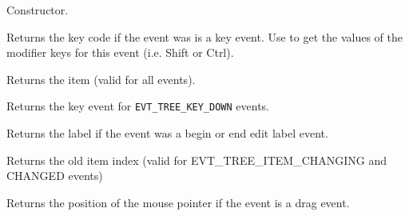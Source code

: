 Constructor.



Returns the key code if the event was is a key event. Use 
 to get the values of the
modifier keys for this event (i.e. Shift or Ctrl).



Returns the item (valid for all events).

\label{wxtreeeventgetkeyevent}


Returns the key event for {\tt EVT\_TREE\_KEY\_DOWN} events.



Returns the label if the event was a begin or end edit label event.



Returns the old item index (valid for EVT\_TREE\_ITEM\_CHANGING and CHANGED events)



Returns the position of the mouse pointer if the event is a drag event.

